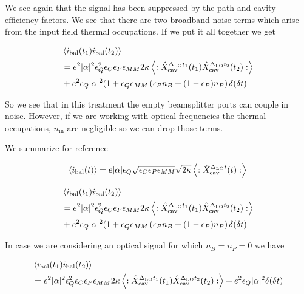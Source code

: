 \documentclass[12pt]{article}
\begin{document}
We see again that the signal has been suppressed by the path and cavity efficiency factors. We see that there are two broadband noise terms which arise from the input field thermal occupations. If we put it all together we get

\begin{align}
&\Braket{i_{\text{bal}}(t_1)i_{\text{bal}}(t_2)}\\
&= e^2 |\alpha|^2 \epsilon_Q^2 \epsilon_C \epsilon_P \epsilon_{MM} 2\kappa \Braket{:\hat{X}_{\text{cav}}^{\Delta_{\text{LO}}t_1}(t_1)\hat{X}_{\text{cav}}^{\Delta_{\text{LO}}t_2}(t_2) :}\\
&+ e^2 \epsilon_Q |\alpha|^2(1+\epsilon_Q\epsilon_{MM}\left(\epsilon_P\bar{n}_B + (1-\epsilon_P)\bar{n}_P\right) \delta(\delta t)
\end{align}

So we see that in this treatment the empty beamsplitter ports can couple in noise. However, if we are working with optical frequencies the thermal occupations, $\bar{n}_{\text{in}}$ are negligible so we can drop those terms.

We summarize for reference

\begin{align}
\Braket{i_{\text{bal}}(t)} &= e|\alpha|\epsilon_Q \sqrt{\epsilon_C \epsilon_P \epsilon_{MM}} \sqrt{2\kappa} \Braket{:\hat{X}_{\text{cav}}^{\Delta_{\text{LO}}t}(t):}\\
\end{align}

\begin{align}
&\Braket{i_{\text{bal}}(t_1)i_{\text{bal}}(t_2)}\\
&= e^2 |\alpha|^2 \epsilon_Q^2 \epsilon_C \epsilon_P \epsilon_{MM} 2\kappa \Braket{:\hat{X}_{\text{cav}}^{\Delta_{\text{LO}}t_1}(t_1)\hat{X}_{\text{cav}}^{\Delta_{\text{LO}}t_2}(t_2) :}\\
&+ e^2 \epsilon_Q |\alpha|^2(1+\epsilon_Q\epsilon_{MM}\left(\epsilon_P\bar{n}_B + (1-\epsilon_P)\bar{n}_P\right) \delta(\delta t)
\end{align}

In case we are considering an optical signal for which $\bar{n}_B = \bar{n}_P=0$ we have

\begin{align}
&\Braket{i_{\text{bal}}(t_1)i_{\text{bal}}(t_2)}\\
&= e^2 |\alpha|^2 \epsilon_Q^2 \epsilon_C \epsilon_P \epsilon_{MM} 2\kappa \Braket{:\hat{X}_{\text{cav}}^{\Delta_{\text{LO}}t_1}(t_1)\hat{X}_{\text{cav}}^{\Delta_{\text{LO}}t_2}(t_2) :} + e^2 \epsilon_Q |\alpha|^2\delta(\delta t)
\end{align}

\printbibliography
\end{document}
